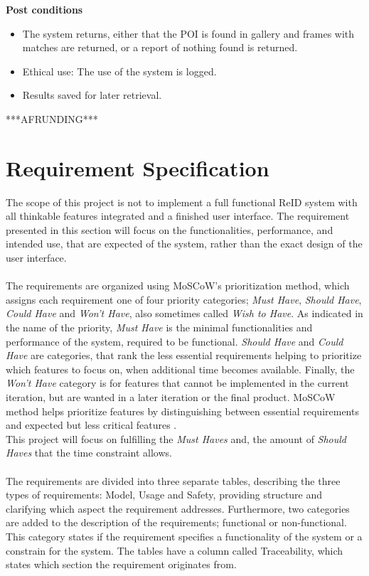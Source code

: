 \noindent\textbf{Post conditions} 
\begin{itemize}
    \item The system returns, either that the \ac{POI} is found in gallery and frames with matches are returned, or a report of nothing found is returned.
    \item Ethical use: The use of the system is logged.
    \item Results saved for later retrieval.
\end{itemize}

***AFRUNDING***

\section{Requirement Specification} \label{sec:reqspec}
The scope of this project is not to implement a full functional \acs{ReID} system with all thinkable features integrated and a finished user interface. The requirement presented in this section will focus on the functionalities, performance, and intended use, that are expected of the system, rather than the exact design of the user interface.
\\\\
The requirements are organized using MoSCoW's prioritization method, which assigns each requirement one of four priority categories; \textit{Must Have}, \textit{Should Have}, \textit{Could Have} and \textit{Won't Have}, also sometimes called \textit{Wish to Have}. As indicated in the name of the priority, \textit{Must Have} is the minimal functionalities and performance of the system, required to be functional. \textit{Should Have} and \textit{Could Have} are categories, that rank the less essential requirements helping to prioritize which features to focus on, when additional time becomes available. Finally, the \textit{Won't Have} category is for features that cannot be implemented in the current iteration, but are wanted in a later iteration or the final product. MoSCoW method helps prioritize features by distinguishing between essential requirements and expected but less critical features \cite{Moscow}. 
\\
This project will focus on fulfilling the \textit{Must Haves} and, the amount of \textit{Should Haves} that the time constraint allows.
\\\\
The requirements are divided into three separate tables, describing the three types of requirements: Model, Usage and Safety, providing structure and clarifying which aspect the requirement addresses. Furthermore, two categories are added to the description of the requirements; functional or non-functional. This category states if the requirement specifies a functionality of the system or a constrain for the system. The tables have a column called Traceability, which states which section the requirement originates from.
